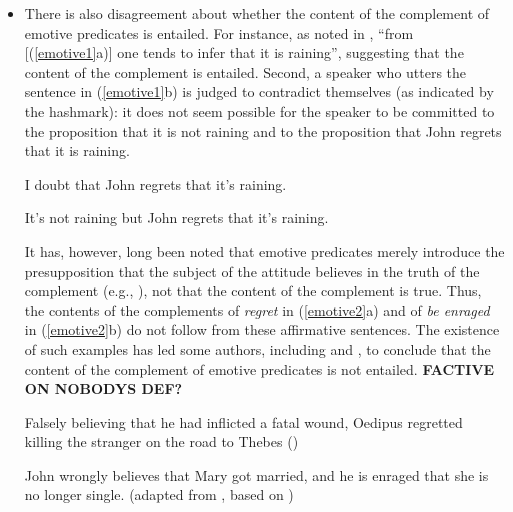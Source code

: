 \documentclass[11pt,fleqn]{article}
\def\infelic{{\leavevmode\llap{\#}}}
\newcommand{\6}{\mbox{$[\hspace*{-.6mm}[$}}
\newcommand{\9}{\mbox{$]\hspace*{-.6mm}]$}}
\begin{document}
\begin{itemize}
\item There is also disagreement about whether the content of the complement of emotive predicates is entailed. For instance, as noted in \citealt[514]{abrusan2011}, ``from [(\ref{emotive1}a)] one tends to infer that it is raining'', suggesting that the content of the complement is entailed. Second, a speaker who utters the sentence in (\ref{emotive1}b) is judged to contradict themselves (as indicated by the hashmark): it does not seem possible for the speaker to be committed to the proposition that it is not raining and to the proposition that John regrets that it is raining.

\begin{exe}

\ex\label{emotive1} \citealt[514]{abrusan2011}

\begin{xlist}

\ex I doubt that John regrets that it's raining.

\ex \infelic It's not raining but John regrets that it's raining. 

\end{xlist}

\end{exe}

It has, however, long been noted that emotive predicates merely introduce the presupposition that the subject of the attitude believes in the truth of the complement (e.g., \citealt[203]{heim92}), not that the content of the complement is true. Thus, the contents of the complements of {\em regret} in (\ref{emotive2}a) and of {\em be enraged} in (\ref{emotive2}b) do not follow from these affirmative sentences. The existence of such examples has led some authors, including \citet{klein1975,giannakidou1998,schlenker2003} and \citet{egre2008}, to conclude that the content of the complement of emotive predicates is not entailed. {\bf FACTIVE ON NOBODYS DEF?}

\begin{exe}

\ex\label{emotive2}

\begin{xlist}

\ex Falsely believing that he had inflicted a fatal wound, Oedipus regretted killing the stranger on the road to Thebes \hfill (\citealt{klein1975})

\ex John wrongly believes that Mary got married, and he is enraged that she is no longer single. \hspace*{.2cm} \hfill (adapted from \citealt{egre2008}, based on \citealt{schlenker03})


\end{xlist}
\end{exe}
\end{itemize}
\end{document}
